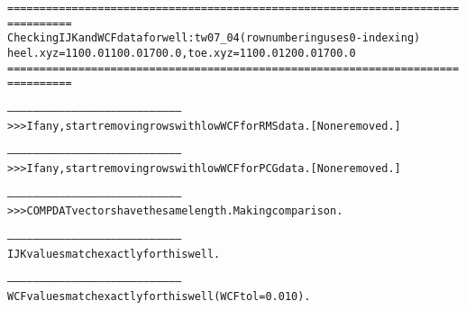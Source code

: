 \begin{alltt}
================================================================================
Checking IJK and WCF data for well: tw07_04 (row numbering uses 0-indexing)
heel.xyz = 1100.0 1100.0 1700.0, toe.xyz = 1100.0 1200.0 1700.0
================================================================================

--------------------------------------------------------------------------------
>>> If any, start removing rows with low WCF for RMS data. [None removed.]

--------------------------------------------------------------------------------
>>> If any, start removing rows with low WCF for PCG data. [None removed.]

--------------------------------------------------------------------------------
>>> COMPDAT vectors have the same length. Making comparison.

--------------------------------------------------------------------------------
IJK values match exactly for this well.

--------------------------------------------------------------------------------
WCF values match exactly for this well (WCF tol = 0.010).
\end{alltt}
